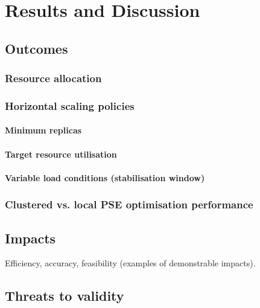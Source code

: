 \chapter{Results and Discussion}

\section{Outcomes}
\subsection{Resource allocation}
\subsection{Horizontal scaling policies}
\subsubsection{Minimum replicas}
\subsubsection{Target resource utilisation}
\subsubsection{Variable load conditions (stabilisation window)}
\subsection{Clustered vs. local PSE optimisation performance}

\section{Impacts}
Efficiency, accuracy, feasibility (examples of demonstrable impacts).
\section{Threats to validity}